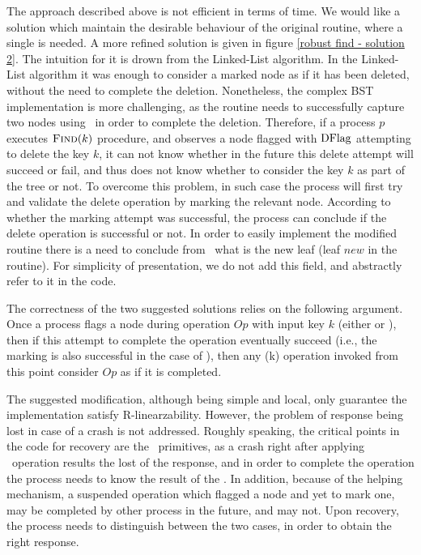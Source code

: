 The approach described above is not efficient in terms of time. We would like a solution which maintain the desirable behaviour of the original  routine, where a single  is needed. A more refined solution is given in figure \ref{robust find - solution 2}. The intuition for it is drown from the Linked-List algorithm.
In the Linked-List algorithm it was enough to consider a marked node as if it has been deleted, without the need to complete the deletion. Nonetheless, the complex BST implementation is more challenging, as the  routine needs to successfully capture two nodes using \CASB\ in order to complete the deletion. Therefore, if a process $p$ executes $\mbox{\sc Find}(k)$ procedure, and observes a node flagged with $\mbox{DFlag}$ attempting to delete the key $k$, it can not know whether in the future this delete attempt will succeed or fail, and thus does not know whether to consider the key $k$ as part of the tree or not. To overcome this problem, in such case the process will first try and validate the delete operation by marking the relevant node. According to whether the marking attempt was successful, the process can conclude if the delete operation is successful or not.
In order to easily implement the modified  routine there is a need to conclude from \IFlag\ what is the new leaf (leaf $new$ in the  routine). For simplicity of presentation, we do not add this field, and abstractly refer to it in the code.

The correctness of the two suggested solutions relies on the following argument.
Once a process flags a node during operation $Op$ with input key $k$ (either  or ), then if this attempt to complete the operation eventually succeed (i.e., the marking is also successful in the case of ), then any (k) operation invoked from this point consider $Op$ as if it is completed.

The suggested modification, although being simple and local, only guarantee the implementation satisfy R-linearzability. However, the problem of response being lost in case of a crash is not addressed. Roughly speaking, the critical points in the code for recovery are the \CASB\ primitives, as a crash right after applying \CASB\ operation results the lost of the response, and in order to complete the operation the process needs to know the result of the \CASB. In addition, because of the helping mechanism, a suspended  operation which flagged a node and yet to mark one, may be completed by other process in the future, and may not. Upon recovery, the process needs to distinguish between the two cases, in order to obtain the right response.

